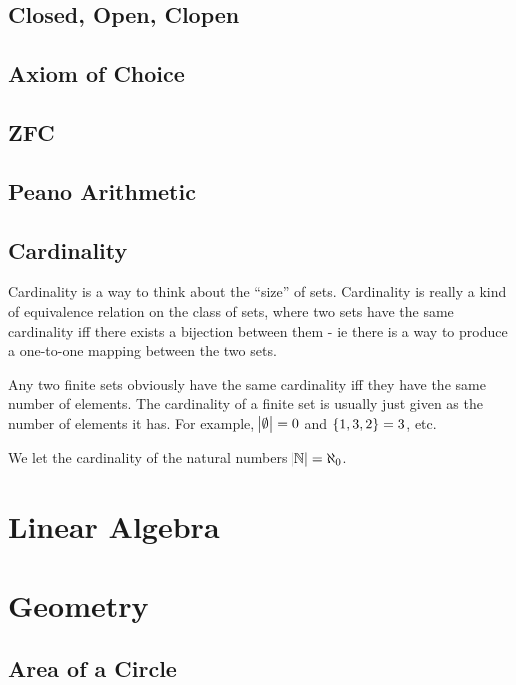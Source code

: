 \documentclass[a4paper,11pt]{article}
\begin{document}
    \subsection{Closed, Open, Clopen}

    \subsection{Axiom of Choice}

    \subsection{ZFC}

    \subsection{Peano Arithmetic}

    \subsection{Cardinality}

    Cardinality is a way to think about the ``size'' of sets. Cardinality is
    really a kind of equivalence relation on the class of sets, where two sets
    have the same cardinality iff there exists a bijection between them - ie
    there is a way to produce a one-to-one mapping between the two sets.

    Any two finite sets obviously have the same cardinality iff they have the
    same number of elements. The cardinality of a finite set is usually just
    given as the number of elements it has. For example, $\abs \emptyset = 0$
    and $\set{1, 3, 2} = 3$, etc.

    We let the cardinality of the natural numbers $\abs{\mathbb{N}} = \aleph_0$.

    \section{Linear Algebra}

    \section{Geometry}

    \subsection{Area of a Circle}
\end{document}
